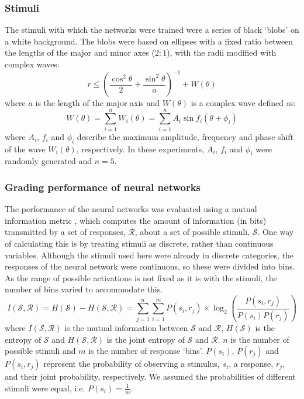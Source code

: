 \subsubsection{Stimuli}
\label{sec:methods:stimuli}
The stimuli with which the networks were trained were a series of black `blobs' on a white background.
The blobs were based on ellipses with a fixed ratio between the lengths of the major and minor axes ($2:1$), with the radii modified with complex waves:
$$
r \le \left(\frac{\cos^2 \theta}{2} + \frac{\sin^2 \theta}{a} \right)^{-1} + W(\theta)
$$
where $a$ is the length of the major axis and $W(\theta)$ is a complex wave defined as:
$$
W(\theta) = \sum_{i=1}^n W_i(\theta) = \sum_{i=1}^n A_i \sin f_i (\theta+\phi_i) 
$$
where $A_i$, $f_i$ and $\phi_i$ describe the maximum amplitude, frequency and phase shift of the wave $W_i(\theta)$, respectively.
In these experiments, $A_i$, $f_i$ and $\phi_i$ were randomly generated and $n=5$.

\subsubsection{Grading performance of neural networks}
The performance of the neural networks was evaluated using a mutual information metric \cite{Thomson2005}, which computes the amount of information (in bits) transmitted by a set of responses, $\mathcal{R}$, about a set of possible stimuli, $\mathcal{S}$.
One way of calculating this is by treating stimuli as discrete, rather than continuous variables.
Although the stimuli used here were already in discrete categories, the responses of the neural network were continuous, so these were divided into bins.
As the range of possible activations is not fixed as it is with the stimuli, the number of bins varied to accommodate this.
$$
I(\mathcal{S},\mathcal{R}) = H(\mathcal{S})-H(\mathcal{S},\mathcal{R}) = \sum\limits^n_{j=1} \sum\limits^m_{i=1} P(s_i,r_j)\times \log_2 \left( \frac{P(s_i,r_j)}{P(s_i)P(r_j)} \right)
$$
where $I(\mathcal{S},\mathcal{R})$ is the mutual information between $\mathcal{S}$ and $\mathcal{R}$, $H(\mathcal{S})$ is the entropy of $\mathcal{S}$ and $H(\mathcal{S},\mathcal{R})$ is the joint entropy of $\mathcal{S}$ and $\mathcal{R}$.
$n$ is the number of possible stimuli and $m$ is the number of response `bins'.
$P(s_i)$, $P(r_j)$ and $P(s_i,r_j)$ represent the probability of observing a stimulus, $s_i$, a response, $r_j$, and their joint probability, respectively.
We assumed the probabilities of different stimuli were equal, i.e. $P(s_i) = \frac{1}{m}$.

